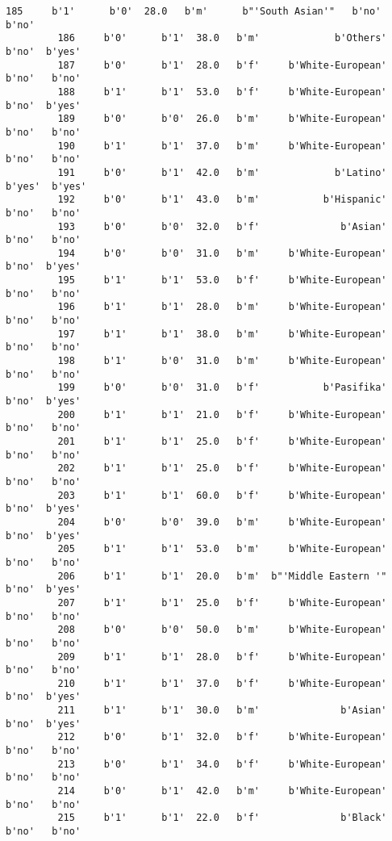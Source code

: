 \documentclass[11pt]{article}
\begin{document}
\begin{Verbatim}[commandchars=\\\{\}]
         185     b'1'      b'0'  28.0   b'm'      b"'South Asian'"   b'no'   b'no'   
         186     b'0'      b'1'  38.0   b'm'             b'Others'   b'no'  b'yes'   
         187     b'0'      b'1'  28.0   b'f'     b'White-European'   b'no'   b'no'   
         188     b'1'      b'1'  53.0   b'f'     b'White-European'   b'no'  b'yes'   
         189     b'0'      b'0'  26.0   b'm'     b'White-European'   b'no'   b'no'   
         190     b'1'      b'1'  37.0   b'm'     b'White-European'   b'no'   b'no'   
         191     b'0'      b'1'  42.0   b'm'             b'Latino'  b'yes'  b'yes'   
         192     b'0'      b'1'  43.0   b'm'           b'Hispanic'   b'no'   b'no'   
         193     b'0'      b'0'  32.0   b'f'              b'Asian'   b'no'   b'no'   
         194     b'0'      b'0'  31.0   b'm'     b'White-European'   b'no'  b'yes'   
         195     b'1'      b'1'  53.0   b'f'     b'White-European'   b'no'   b'no'   
         196     b'1'      b'1'  28.0   b'm'     b'White-European'   b'no'   b'no'   
         197     b'1'      b'1'  38.0   b'm'     b'White-European'   b'no'   b'no'   
         198     b'1'      b'0'  31.0   b'm'     b'White-European'   b'no'   b'no'   
         199     b'0'      b'0'  31.0   b'f'           b'Pasifika'   b'no'  b'yes'   
         200     b'1'      b'1'  21.0   b'f'     b'White-European'   b'no'   b'no'   
         201     b'1'      b'1'  25.0   b'f'     b'White-European'   b'no'   b'no'   
         202     b'1'      b'1'  25.0   b'f'     b'White-European'   b'no'   b'no'   
         203     b'1'      b'1'  60.0   b'f'     b'White-European'   b'no'  b'yes'   
         204     b'0'      b'0'  39.0   b'm'     b'White-European'   b'no'  b'yes'   
         205     b'1'      b'1'  53.0   b'm'     b'White-European'   b'no'   b'no'   
         206     b'1'      b'1'  20.0   b'm'  b"'Middle Eastern '"   b'no'  b'yes'   
         207     b'1'      b'1'  25.0   b'f'     b'White-European'   b'no'   b'no'   
         208     b'0'      b'0'  50.0   b'm'     b'White-European'   b'no'   b'no'   
         209     b'1'      b'1'  28.0   b'f'     b'White-European'   b'no'   b'no'   
         210     b'1'      b'1'  37.0   b'f'     b'White-European'   b'no'  b'yes'   
         211     b'1'      b'1'  30.0   b'm'              b'Asian'   b'no'  b'yes'   
         212     b'0'      b'1'  32.0   b'f'     b'White-European'   b'no'   b'no'   
         213     b'0'      b'1'  34.0   b'f'     b'White-European'   b'no'   b'no'   
         214     b'0'      b'1'  42.0   b'm'     b'White-European'   b'no'   b'no'   
         215     b'1'      b'1'  22.0   b'f'              b'Black'   b'no'   b'no'   

\end{Verbatim}
\end{document}
